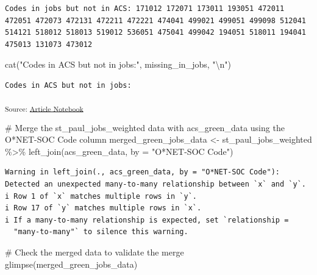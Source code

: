 \documentclass[
  letterpaper,
  DIV=11,
  numbers=noendperiod]{scrartcl}
\newenvironment{Shaded}{\begin{snugshade}}{\end{snugshade}}
\newcommand{\AttributeTok}[1]{\textcolor[rgb]{0.40,0.45,0.13}{#1}}
\newcommand{\CommentTok}[1]{\textcolor[rgb]{0.37,0.37,0.37}{#1}}
\newcommand{\FunctionTok}[1]{\textcolor[rgb]{0.28,0.35,0.67}{#1}}
\newcommand{\NormalTok}[1]{\textcolor[rgb]{0.00,0.23,0.31}{#1}}
\newcommand{\OtherTok}[1]{\textcolor[rgb]{0.00,0.23,0.31}{#1}}
\newcommand{\SpecialCharTok}[1]{\textcolor[rgb]{0.37,0.37,0.37}{#1}}
\newcommand{\StringTok}[1]{\textcolor[rgb]{0.13,0.47,0.30}{#1}}
\begin{document}
\begin{verbatim}
Codes in jobs but not in ACS: 171012 172071 173011 193051 472011 472051 472073 472131 472211 472221 474041 499021 499051 499098 512041 514121 518012 518013 519012 536051 475041 499042 194051 518011 194041 475013 131073 473012 
\end{verbatim}

\begin{Shaded}
\begin{Highlighting}[]
\FunctionTok{cat}\NormalTok{(}\StringTok{"Codes in ACS but not in jobs:"}\NormalTok{, missing\_in\_jobs, }\StringTok{"}\SpecialCharTok{\textbackslash{}n}\StringTok{"}\NormalTok{)}
\end{Highlighting}
\end{Shaded}

\begin{verbatim}
Codes in ACS but not in jobs:  
\end{verbatim}

\textsubscript{Source:
\href{https://beeckcenter.github.io/climate-equity-workforce/index-preview.html}{Article
Notebook}}

\begin{Shaded}
\begin{Highlighting}[]
\CommentTok{\# Merge the \textquotesingle{}st\_paul\_jobs\_weighted\textquotesingle{} data with \textquotesingle{}acs\_green\_data\textquotesingle{} using the \textquotesingle{}O*NET{-}SOC Code\textquotesingle{} column}
\NormalTok{merged\_green\_jobs\_data }\OtherTok{\textless{}{-}}\NormalTok{ st\_paul\_jobs\_weighted }\SpecialCharTok{\%\textgreater{}\%}
  \FunctionTok{left\_join}\NormalTok{(acs\_green\_data, }\AttributeTok{by =} \StringTok{"O*NET{-}SOC Code"}\NormalTok{)}
\end{Highlighting}
\end{Shaded}

\begin{verbatim}
Warning in left_join(., acs_green_data, by = "O*NET-SOC Code"): Detected an unexpected many-to-many relationship between `x` and `y`.
i Row 1 of `x` matches multiple rows in `y`.
i Row 17 of `y` matches multiple rows in `x`.
i If a many-to-many relationship is expected, set `relationship =
  "many-to-many"` to silence this warning.
\end{verbatim}

\begin{Shaded}
\begin{Highlighting}[]
\CommentTok{\# Check the merged data to validate the merge}
\FunctionTok{glimpse}\NormalTok{(merged\_green\_jobs\_data)}
\end{Highlighting}
\end{Shaded}
\end{document}
